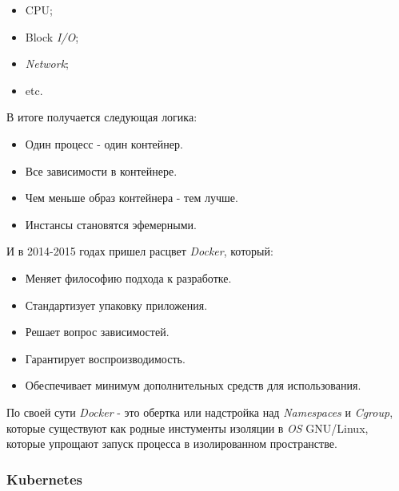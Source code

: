 \begin{itemize}
\begin{itemize}
\begin{itemize}
                    \item CPU;
                    \item Block \textit{I/O};
                    \item \textit{Network};
                    \item etc.
                \end{itemize}
        \end{itemize}
        В итоге получается следующая логика:
        \begin{itemize}
            \item Один процесс - один контейнер.
            \item Все зависимости в контейнере.
            \item Чем меньше образ контейнера - тем лучше.
            \item Инстансы становятся эфемерными.
        \end{itemize}
        И в 2014-2015 годах пришел расцвет \textit{Docker}, который:
        \begin{itemize}
            \item Меняет философию подхода к разработке.
            \item Стандартизует упаковку приложения.
            \item Решает вопрос зависимостей.
            \item Гарантирует воспроизводимость.
            \item Обеспечивает минимум дополнительных средств для использования.
        \end{itemize}
\end{itemize}
По своей сути \textit{Docker} - это обертка или надстройка над \textit{Namespaces} и \textit{Cgroup}, которые существуют как родные инстументы изоляции в \textit{OS} GNU/Linux, которые упрощают запуск процесса в изолированном пространстве.

\subsubsection{Kubernetes}

